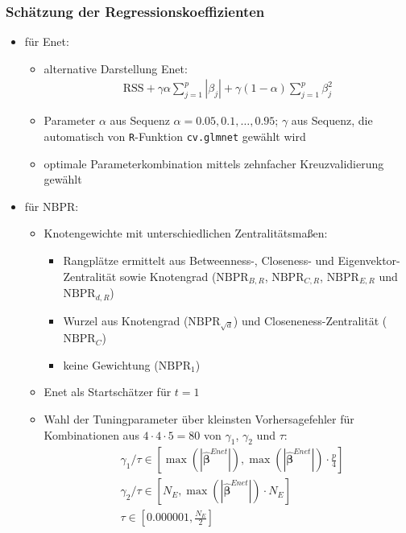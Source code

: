 \documentclass{beamer}
\begin{document}
\begin{frame}
	\frametitle{Schätzung der Regressionskoeffizienten}
	\begin{itemize}
	\item für Enet:
	\begin{itemize}
	\item alternative Darstellung Enet:
	\begin{align*}
	\text{RSS}+\gamma \alpha \sum_{j=1}^{p}|\beta_j| + \gamma (1-\alpha) \sum_{j=1}^{p}\beta_j^2
	\end{align*}
	\item Parameter $\alpha$ aus Sequenz $\alpha={0.05, 0.1, \dots ,0.95}$; $\gamma$ aus Sequenz, die automatisch von \texttt{R}-Funktion \texttt{cv.glmnet} gewählt wird 
	\item optimale Parameterkombination mittels zehnfacher Kreuzvalidierung gewählt
	\end{itemize}
	\end{itemize}
\end{frame}

\begin{frame}
	\begin{itemize}
	\item für $\text{NBPR}$:
	\begin{itemize}
	\item Knotengewichte mit unterschiedlichen Zentralitätsmaßen:
	\begin{itemize}
	\item Rangplätze ermittelt aus Betweenness-, Closeness- und Eigenvektor-Zentralität sowie Knotengrad ($\text{NBPR}_{B,R}$, $\text{NBPR}_{C,R}$, $\text{NBPR}_{E,R}$ und $\text{NBPR}_{d,R}$)
	\item Wurzel aus Knotengrad ($\text{NBPR}_{\sqrt{d}}$) und Closeneness-Zentralität ($\text{NBPR}_{C}$)
	\item keine Gewichtung ($\text{NBPR}_{1}$)
	\end{itemize}
	\item Enet als Startschätzer für $t=1$
	\item Wahl der Tuningparameter über kleinsten Vorhersagefehler für Kombinationen aus $4\cdot 4 \cdot 5 =80$ von $\gamma_1$, $\gamma_2$ und $\tau$:
	\begin{align*}
	&\gamma_1/\tau \in \left[ \max(|\boldsymbol{\hat{\beta}}^{Enet}|), \max(|\boldsymbol{\hat{\beta}}^{Enet}|) \cdot \frac{p}{4} \right] \\
	&\gamma_2/\tau \in \left[ N_E, \max(|\boldsymbol{\hat{\beta}}^{Enet}|) \cdot N_E \right]\\
	&\tau \in \left[0.000001, \frac{N_E}{2}\right]
	\end{align*}
	\end{itemize}
	\end{itemize}
\end{frame}
\end{document}
